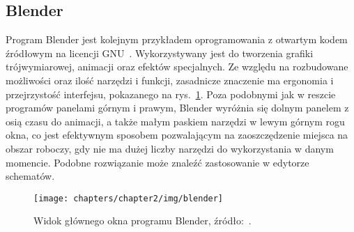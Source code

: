 \subsection{Blender}
\label{subsec:blender}

Program Blender jest kolejnym przykładem oprogramowania z otwartym kodem źródłowym na licencji GNU~\cite{blender_site}.
Wykorzystywany jest do tworzenia grafiki trójwymiarowej, animacji oraz efektów specjalnych.
Ze względu na rozbudowane możliwości oraz ilość narzędzi i funkcji,
zasadnicze znaczenie ma ergonomia i przejrzystość interfejsu, pokazanego na rys.~\ref{fig:blender_okno}.
Poza podobnymi jak w reszcie programów panelami górnym i prawym,
Blender wyróżnia się dolnym panelem z osią czasu do animacji, a także małym paskiem narzędzi w lewym górnym rogu okna,
co jest efektywnym sposobem pozwalającym na zaoszczędzenie miejsca na obszar roboczy,
gdy nie ma dużej liczby narzędzi do wykorzystania w danym momencie.
Podobne rozwiązanie może znaleźć zastosowanie w edytorze schematów.

\begin{figure}[h]
    \centering
    \texttt{[image: chapters/chapter2/img/blender]}
    \caption[Widok głównego okna programu Blender.]{Widok głównego okna programu Blender, źródło:~\cite{blender_site}.}
    \label{fig:blender_okno}
\end{figure}
